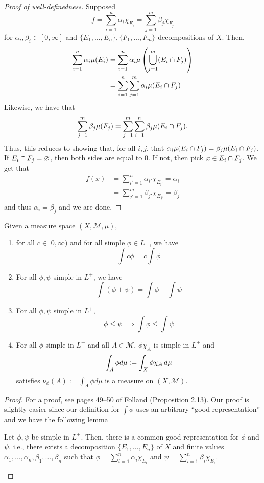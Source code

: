 \documentclass[11pt,leqno,oneside]{amsbook}
\numberwithin{thm}{section}
\newcommand{\M}{\mathcal{M}} %
\renewcommand{\emptyset}{\varnothing}
\begin{document}
\begin{proof}[Proof of well-definedness]
  Supposed \[
    f = \sum_{i=1}^n \alpha_i \chi_{E_i} = \sum_{j=1}^m \beta_j \chi_{F_j}
  \]
  for $\alpha_i, \beta_i \in [0,\infty]$ and $\{E_1, \ldots, E_n\},
  \{F_1, \ldots, F_m\}$ decompositions of $X$. Then,
  \begin{align*}
    \sum_{i=1}^n \alpha_i \mu(E_i) & = \sum_{i=1}^n \alpha_i
                                     \mu \left(\bigcup_{j=1}^m (E_i
                                     \cap F_j)\right) \\
    & = \sum_{i=1}^n \sum_{j=1}^m \alpha_i \mu(E_i \cap F_j)
  \end{align*}
  Likewise, we have that \[
    \sum_{j=1}^m \beta_j \mu(F_j) = \sum_{j=1}^m \sum_{i=1}^n \beta_j
    \mu(E_i \cap F_j).
  \]
  Thus, this reduces to showing that, for all $i,j$, that $\alpha_i
  \mu(E_i \cap F_j) = \beta_j \mu(E_i \cap F_j)$. If $E_i
  \intersect F_j = \emptyset$, then both sides are equal to 0. If not,
  then pick $x \in E_i \cap F_j$. We get that
  \begin{align*}
    f(x) & = \sum_{i'=1}^n \alpha_{i'} \chi_{E_{i'}} = \alpha_i \\
    & = \sum_{j'=1}^m \beta_{j'} \chi_{E_{j'}} = \beta_j
  \end{align*}
  and thus $\alpha_i = \beta_j$ and we are done.
\end{proof}
\begin{prop}\label{integration-props}
  Given a measure space $(X,\M,\mu)$,
  \begin{enumerate}
  \item for all $c \in [0,\infty)$ and for all simple $\phi \in L^+$,
    we have \[
      \int c \phi = c \int \phi
    \]
  \item For all $\phi,\psi$ simple in $L^+$, we have \[
      \int (\phi+\psi) = \int \phi + \int \psi
    \]
  \item For all $\phi, \psi$ simple in $L^+$, \[
      \phi \leq \psi \implies \int \phi \leq \int \psi
    \]
  \item For all $\phi$ simple in $L^+$ and all $A \in \M$, $\phi
    \chi_A$ is simple in $L^+$ and \[
      \int_A \phi d \mu := \int_X \phi \chi_A \, d\mu
    \]
    satisfies $\nu_\phi(A) :=  \int_A \phi d \mu$ is a measure on $(X,\M)$.
  \end{enumerate}
\end{prop}
\begin{proof}
  For a proof, see pages 49--50 of Folland (Proposition 2.13). Our
  proof is slightly easier since our definition for $\int \phi$ uses
  an arbitrary ``good representation'' and we have the following lemma
  \begin{lem}
    Let $\phi,\psi$ be simple in $L^+$. Then, there is a common good
    representation for $\phi$ and $\psi$. i.e., there exists a
    decomposition $\{E_1, \ldots, E_n\}$ of $X$ and finite values
    $\alpha_1, \ldots, \alpha_n, \beta_1, \ldots, \beta_n$ such that
    $\phi = \sum_{i=1}^n \alpha_i \chi_{E_i}$ and $\psi = \sum_{i=1}^n
    \beta_i \chi_{E_i}$.
  \end{lem}
\end{proof}
\end{document}
